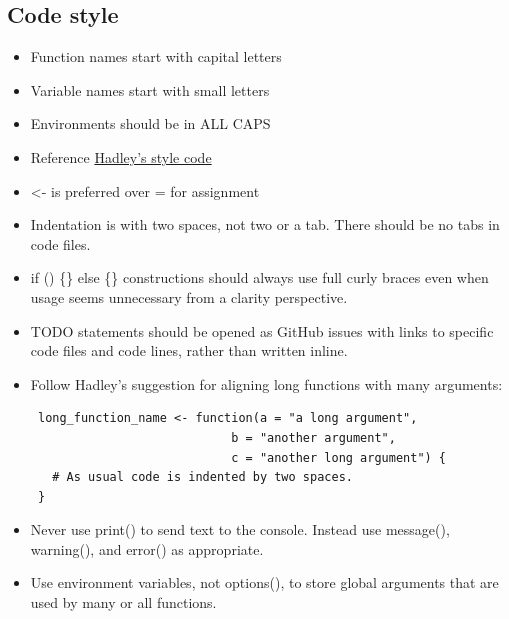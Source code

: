 \documentclass[12pt,]{article}
\begin{document}
\subsection{Code style}\label{code-style}

\begin{itemize}
\item
  Function names start with capital letters
\item
  Variable names start with small letters
\item
  Environments should be in ALL CAPS
\item
  Reference \href{http://adv-r.had.co.nz/Style.html}{Hadley's style
  code}
\item
  \textless{}- is preferred over = for assignment
\item
  Indentation is with two spaces, not two or a tab. There should be no
  tabs in code files.
\item
  if () \{\} else \{\} constructions should always use full curly braces
  even when usage seems unnecessary from a clarity perspective.
\item
  TODO statements should be opened as GitHub issues with links to
  specific code files and code lines, rather than written inline.
\item
  Follow Hadley's suggestion for aligning long functions with many
  arguments:

\begin{verbatim}
 long_function_name <- function(a = "a long argument", 
                            b = "another argument",
                            c = "another long argument") {
   # As usual code is indented by two spaces.
 }
\end{verbatim}
\item
  Never use print() to send text to the console. Instead use message(),
  warning(), and error() as appropriate.
\item
  Use environment variables, not options(), to store global arguments
  that are used by many or all functions.
\end{itemize}


\end{document}
